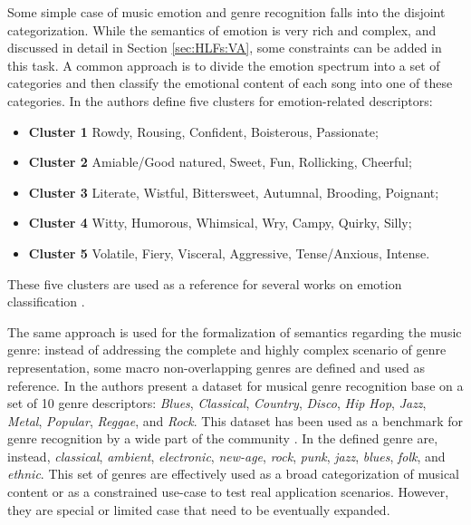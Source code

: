 Some simple case of music emotion and genre recognition falls into the disjoint categorization. While the semantics of emotion is very rich and complex, and discussed in detail in Section \ref{sec:HLFs:VA}, some constraints can be added in this task. A common approach is to divide the emotion spectrum into a set of categories and then classify the emotional content of each song into one of these categories. In \cite{Hu:2007} the authors define five clusters for emotion-related descriptors: 
\begin{itemize}
\item \textbf{Cluster 1} Rowdy, Rousing, Confident, Boisterous, Passionate;
\item \textbf{Cluster 2} Amiable/Good natured, Sweet, Fun, Rollicking, Cheerful;
\item \textbf{Cluster 3} Literate, Wistful, Bittersweet, Autumnal, Brooding, Poignant;
\item \textbf{Cluster 4} Witty, Humorous, Whimsical, Wry, Campy, Quirky, Silly;
\item \textbf{Cluster 5} Volatile, Fiery, Visceral, Aggressive, Tense/Anxious, Intense.
\end{itemize}
These five clusters are used as a reference for several works on emotion classification \cite{Bischoff:2009, laurier2008multimodal, Laurier2009}.

The same approach is used for the formalization of semantics regarding the music genre: instead of addressing the complete and highly complex scenario of genre representation, some macro non-overlapping genres are defined and used as reference. In \cite{tzanetakis2002musical} the authors present a dataset for musical genre recognition base on a set of 10 genre descriptors: \textit{Blues}, \textit{Classical}, \textit{Country}, \textit{Disco}, \textit{Hip Hop}, \textit{Jazz}, \textit{Metal}, \textit{Popular}, \textit{Reggae}, and \textit{Rock}. This dataset has been used as a benchmark for genre recognition by a wide part of the community \cite{Sturm2012GTZAN}. In \cite{Scaringella2006} the defined genre are, instead, \textit{classical}, \textit{ambient}, \textit{electronic}, \textit{new-age}, \textit{rock}, \textit{punk}, \textit{jazz}, \textit{blues}, \textit{folk}, and \textit{ethnic}. This set of genres are effectively used as a broad categorization of musical content or as a constrained use-case to test real application scenarios. However, they are special or limited case that need to be eventually expanded.
%
